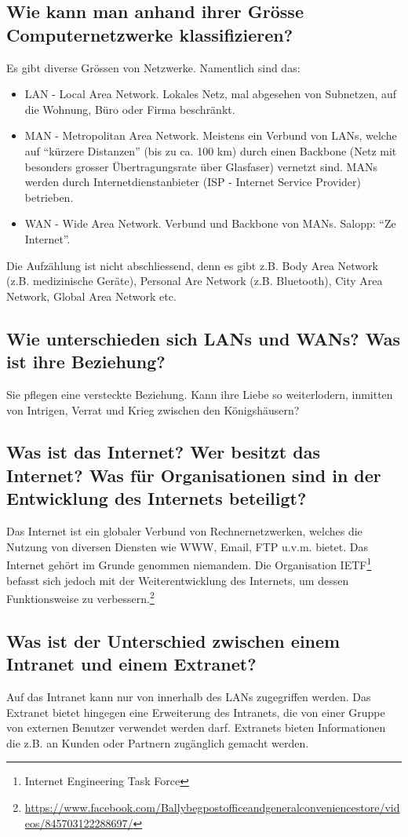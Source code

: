 \subsection*{Wie kann man anhand ihrer Grösse Computernetzwerke klassifizieren?}
Es gibt diverse Grössen von Netzwerke. Namentlich sind das:
\begin{itemize}
    \item LAN - Local Area Network. Lokales Netz, mal abgesehen von Subnetzen, auf die Wohnung, Büro oder Firma beschränkt.
    \item MAN - Metropolitan Area Network. Meistens ein Verbund von LANs, welche auf ``kürzere Distanzen'' (bis zu ca. 100 km) durch einen Backbone (Netz mit besonders grosser Übertragungsrate über Glasfaser) vernetzt sind. MANs werden durch Internetdienstanbieter (ISP - Internet Service Provider) betrieben.
    \item WAN - Wide Area Network. Verbund und Backbone von MANs. Salopp: ``Ze Internet''.
\end{itemize}
Die Aufzählung ist nicht abschliessend, denn es gibt z.B. Body Area Network (z.B. medizinische Geräte), Personal Are Network (z.B. Bluetooth), City Area Network, Global Area Network etc.
\subsection*{Wie unterschieden sich LANs und WANs? Was ist ihre Beziehung?}
Sie pflegen eine versteckte Beziehung. Kann ihre Liebe so weiterlodern, inmitten von Intrigen, Verrat und Krieg zwischen den Königshäusern?
\subsection*{Was ist das Internet? Wer besitzt das Internet? Was für Organisationen sind in der Entwicklung des Internets beteiligt?}
Das Internet ist ein globaler Verbund von Rechnernetzwerken, welches die Nutzung von diversen Diensten wie WWW, Email, FTP u.v.m. bietet. Das Internet gehört im Grunde genommen niemandem. Die Organisation IETF\footnote{Internet Engineering Task Force} befasst sich jedoch mit der Weiterentwicklung des Internets, um dessen Funktionsweise zu verbessern.\footnote{\url{https://www.facebook.com/Ballybegpostofficeandgeneralconveniencestore/videos/845703122288697/}}
\subsection*{Was ist der Unterschied zwischen einem Intranet und einem Extranet?}
Auf das Intranet kann nur von innerhalb des LANs zugegriffen werden. Das Extranet bietet hingegen eine Erweiterung des Intranets, die von einer Gruppe von externen Benutzer verwendet werden darf. Extranets bieten Informationen die z.B. an Kunden oder Partnern zugänglich gemacht werden.
